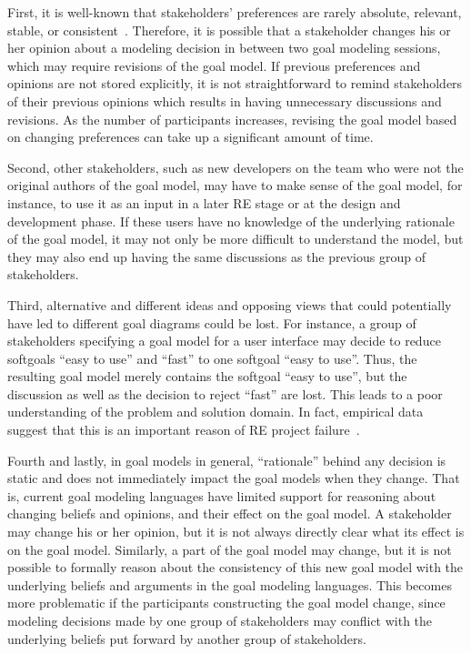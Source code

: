 First, it is well-known that stakeholders' preferences are rarely absolute, relevant, stable, or consistent~\cite{march1978bounded}. Therefore, it is possible that a stakeholder changes his or her opinion about a modeling decision in between two goal modeling sessions, which may require revisions of the goal model. If previous preferences and opinions are not stored explicitly, it is not straightforward to remind stakeholders of their previous opinions which results in having unnecessary discussions and revisions. As the number of participants increases, revising the goal model based on changing preferences can take up a significant amount of time. 

Second, other stakeholders, such as new developers on the team who were not the original authors of the goal model, may have to make sense of the goal model, for instance, to use it as an input in a later RE stage or at the design and development phase. If these users have no knowledge of the underlying rationale of the goal model, it may not only be more difficult to understand the model, but they may also end up having the same discussions as the previous group of stakeholders.

Third, alternative and different ideas and opposing views that could potentially have led to different goal diagrams could be lost. For instance, a group of stakeholders specifying a goal model for a user interface may decide to reduce softgoals ``easy to use'' and ``fast'' to one softgoal ``easy to use''. Thus, the resulting goal model merely contains the softgoal ``easy to use'', but the discussion as well as the decision to reject ``fast'' are lost. This leads to a poor understanding of the problem and solution domain. In fact, empirical data suggest that this is an important reason of RE project failure~\cite{curtis1988field}. 

Fourth and lastly, in goal models in general, ``rationale'' behind any decision is static and does not immediately impact the goal models when they change. That is, current goal modeling languages have limited support for reasoning about changing beliefs and opinions, and their effect on the goal model. A stakeholder may change his or her opinion, but it is not always directly clear what its effect is on the goal model. Similarly, a part of the goal model may change, but it is not possible to formally reason about the consistency of this new goal model with the underlying beliefs and arguments in the goal modeling languages. This becomes more problematic if the participants constructing the goal model change, since modeling decisions made by one group of stakeholders may conflict with the underlying beliefs put forward by another group of stakeholders.

